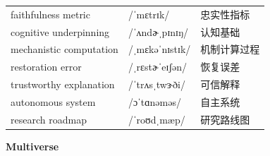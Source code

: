 \documentclass[UTF8,12pt,a4paper]{ctexart}
\providecommand{\zh}[1]{#1}
\begin{document}
\begin{tabular*}{\textwidth}{@{\extracolsep{\fill}}lll@{}}
faithfulness metric & {\ipafont /ˈmɛtrɪk/} & \zh{忠实性指标} \\
cognitive underpinning & {\ipafont /ˈʌndɚˌpɪnɪŋ/} & \zh{认知基础} \\
mechanistic computation & {\ipafont /ˌmɛkəˈnɪstɪk/} & \zh{机制计算过程} \\
restoration error & {\ipafont /ˌrɛstɚˈeɪʃən/} & \zh{恢复误差} \\
trustworthy explanation & {\ipafont /ˈtrʌsˌtwɝði/} & \zh{可信解释} \\
autonomous system & {\ipafont /ɔˈtɑnəməs/} & \zh{自主系统} \\
research roadmap & {\ipafont /ˈroʊdˌmæp/} & \zh{研究路线图} \\
\bottomrule
\end{tabular*}

\newpage

\begin{center}
    {\Large\bfseries Multiverse}
\end{center}
\end{document}
